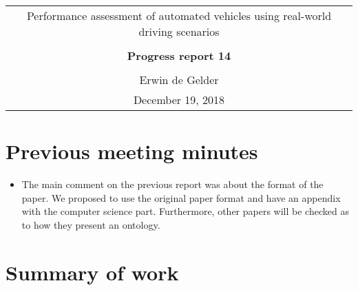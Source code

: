 \documentclass[10pt,final,a4paper,oneside,onecolumn]{article}
\newcommand{\progressreportnumber}{14}
\renewcommand{\author}{Erwin de Gelder}
\renewcommand{\date}{December 19, 2018}
\renewcommand{\title}{Performance assessment of automated vehicles using real-world driving scenarios}
\begin{document}
	
\begin{center}
	\begin{tabular}{c}
		\title \\ \\
		\textbf{\huge Progress report \progressreportnumber} \\ \\
		\author \\ 
		\date
	\end{tabular}
\end{center}

\section{Previous meeting minutes}

\begin{itemize}
	\item The main comment on the previous report was about the format of the paper. We proposed to use the original paper format and have an appendix with the computer science part. Furthermore, other papers will be checked as to how they present an ontology.
\end{itemize}

\section{Summary of work}
\end{document}
